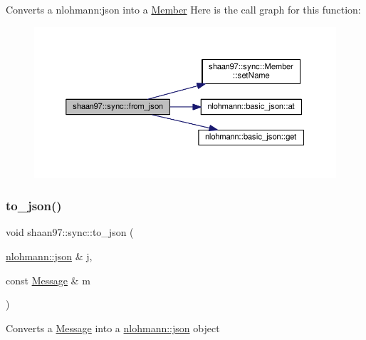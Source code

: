 Converts a {\ttfamily nlohmann\+:json} into a {\ttfamily \hyperlink{classshaan97_1_1sync_1_1_member}{Member}} Here is the call graph for this function\+:
\nopagebreak
\begin{figure}[H]
\begin{center}
\leavevmode
\includegraphics[width=350pt]{group___serialization_ga35dd3deb42a1ec52e00a2980b5c7c842_cgraph}
\end{center}
\end{figure}
\mbox{\label{group___serialization_ga213581ca789d5151c699fb4cb30db916}} 
\subsubsection{\texorpdfstring{to\+\_\+json()}{to\_json()}\hspace{0.1cm}{\footnotesize\ttfamily [1/2]}}
{\footnotesize\ttfamily void shaan97\+::sync\+::to\+\_\+json (\begin{DoxyParamCaption}\item[{\hyperlink{namespacenlohmann_a2bfd99e845a2e5cd90aeaf1b1431f474}{nlohmann\+::json} \&}]{j,  }\item[{const \hyperlink{structshaan97_1_1sync_1_1_message}{Message} \&}]{m }\end{DoxyParamCaption})}



Converts a {\ttfamily \hyperlink{structshaan97_1_1sync_1_1_message}{Message}} into a {\ttfamily \hyperlink{namespacenlohmann_a2bfd99e845a2e5cd90aeaf1b1431f474}{nlohmann\+::json} object} 

\mbox{\label{group___serialization_gaad90c8bd50725f5382dc2207225f52ee}} 
